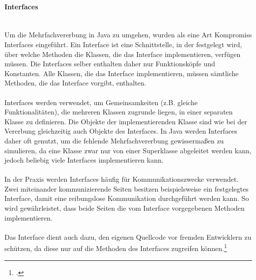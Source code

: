 \paragraph{Interfaces}\ \\
Um die Mehrfachvererbung in Java zu umgehen, wurden als eine Art Kompromiss Interfaces eingeführt. Ein Interface ist eine Schnittstelle, in der festgelegt wird, über welche Methoden die Klassen, die das Interface implementieren, verfügen müssen. Die Interfaces selber enthalten daher nur Funktionsköpfe und Konstanten. Alle Klassen, die das Interface implementieren, müssen sämtliche Methoden, die das Interface vorgibt, enthalten.\\
\\
Interfaces werden verwendet, um Gemeinsamkeiten (z.B. gleiche Funktionalitäten), die mehreren Klassen zugrunde liegen, in einer separaten Klasse zu definieren. Die Objekte der implementierenden Klasse sind wie bei der Vererbung gleichzeitig auch Objekte des Interfaces. In Java werden Interfaces daher oft genutzt, um die fehlende Mehrfachvererbung gewissermaßen zu simulieren, da eine Klasse zwar nur von einer Superklasse abgeleitet werden kann, jedoch beliebig viele Interfaces implementieren kann.\\
\\
In der Praxis werden Interfaces häufig für Kommunikationszwecke verwendet. Zwei miteinander kommunizierende Seiten besitzen beispielsweise ein festgelegtes Interface, damit eine reibungslose Kommunikation durchgeführt werden kann. So wird gewährleistet, dass beide Seiten die vom Interface vorgegebenen Methoden implementieren.\\
\\
Das Interface dient auch dazu, den eigenen Quellcode vor fremden Entwicklern zu schützen, da diese nur auf die Methoden des Interfaces zugreifen können.\footcite{shit_java_tut}

